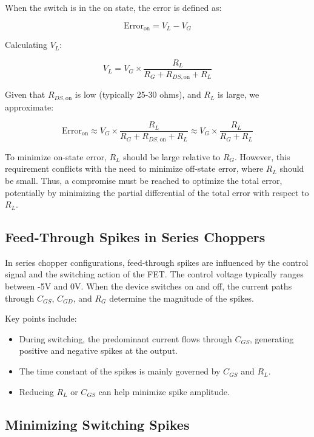 When the switch is in the on state, the error is defined as:

\[
\text{Error}_{\text{on}} = V_L - V_G
\]

Calculating \( V_L \):

\[
V_L = V_G \times \frac{R_L}{R_G + R_{DS,\text{on}} + R_L}
\]

Given that \( R_{DS,\text{on}} \) is low (typically 25-30 ohms), and \( R_L \) is large, we approximate:

\[
\text{Error}_{\text{on}} \approx V_G \times \frac{R_L}{R_G + R_{DS,\text{on}} + R_L} \approx V_G \times \frac{R_L}{R_G + R_L}
\]

To minimize on-state error, \( R_L \) should be large relative to \( R_G \). However, this requirement conflicts with the need to minimize off-state error, where \( R_L \) should be small. Thus, a compromise must be reached to optimize the total error, potentially by minimizing the partial differential of the total error with respect to \( R_L \).

\subsection{Feed-Through Spikes in Series Choppers}

In series chopper configurations, feed-through spikes are influenced by the control signal and the switching action of the FET. The control voltage typically ranges between -5V and 0V. When the device switches on and off, the current paths through \( C_{GS} \), \( C_{GD} \), and \( R_G \) determine the magnitude of the spikes.

Key points include:

\begin{itemize}
    \item During switching, the predominant current flows through \( C_{GS} \), generating positive and negative spikes at the output.
    
    \item The time constant of the spikes is mainly governed by \( C_{GS} \) and \( R_L \).
    
    \item Reducing \( R_L \) or \( C_{GS} \) can help minimize spike amplitude.
\end{itemize}

\subsection{Minimizing Switching Spikes}


